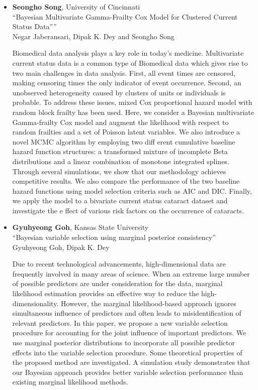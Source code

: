 \begin{itemize}
\item \textbf{Seongho Song}, University of Cincinnati \\
``Bayesian Multivariate Gamma-Frailty Cox Model for Clustered Current Status Data”'' \\
Negar Jaberansari, Dipak K. Dey and Seongho Song


Biomedical data analysis plays a key role in today's medicine. Multivariate current status data is a common type of Biomedical data which gives rise to two main challenges in data analysis. First, all event times are censored, making censoring times the only indicator of event occurrence. Second, an unobserved heterogeneity caused by clusters of units or individuals is probable. To address these issues, mixed Cox proportional hazard model with random block frailty has been used. Here, we consider a Bayesian multivariate Gamma-frailty Cox model and augment the likelihood with respect to random frailties and a set of Poisson latent variables. We also introduce a novel MCMC algorithm by employing two diff erent cumulative baseline hazard function structures: a transformed mixture of incomplete Beta distributions and a linear combination of monotone integrated splines. Through several simulations, we show that our methodology achieves competitive results. We also compare the performance of the two baseline hazard functions using model selection criteria such as AIC and DIC. Finally, we apply the model to a bivariate current status cataract dataset and investigate the e ffect of various risk factors on the occurrence of
cataracts.

\item \textbf{Gyuhyeong Goh}, Kansas State University \\
``Bayesian variable selection using marginal posterior consistency'' \\
Gyuhyeong Goh, Dipak K. Dey


Due to recent technological advancements, high-dimensional data are frequently involved in many areas of science. When an extreme large number of possible predictors are under consideration for the data, marginal likelihood estimation provides an effective way to reduce the high-dimensionality. However, the marginal likelihood-based approach ignores simultaneous influence of predictors and often leads to misidentification of relevant predictors. In this paper, we propose a new variable selection procedure for accounting for the joint influence of important predictors. We use marginal posterior distributions to incorporate all possible predictor effects into the variable selection procedure. Some theoretical properties of the proposed method are investigated. A simulation study demonstrates that our Bayesian approach provides better variable selection performance than existing marginal likelihood methods.

\end{itemize}

